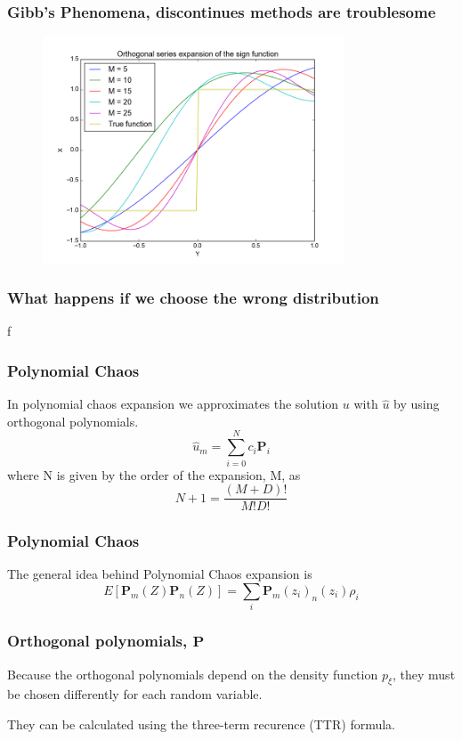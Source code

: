 \documentclass[handout]{beamer}
\newcommand{\p}{\boldsymbol{P}}
\begin{document}
\begin{frame}
  \frametitle{Gibb's Phenomena, discontinues methods are troublesome}
  \begin{figure}
  \includegraphics[width=0.8\textwidth]{gibbs.png}
  \end{figure}

  \end{frame}


\begin{frame}
  \frametitle{What happens if we choose the wrong distribution}
  
\end{frame}














 

\if f


\begin{frame}
  \frametitle{Polynomial Chaos}
  In polynomial chaos expansion we approximates the solution $u$ with $\hat u$ by using orthogonal polynomials.
  \[\hat u_m = \sum_{i=0}^N c_i \p_i\]
  where N is given by the order of the expansion, M, as
  \[N + 1 =\frac{(M + D)!}{M!D!}\]
\end{frame}


\begin{frame}
  \frametitle{Polynomial Chaos}
  The general idea behind Polynomial Chaos expansion is
  \[E[\p_m(Z)\p_n(Z)] = \sum_i \p_m(z_i)_n(z_i)\rho_i\]
\end{frame}



\begin{frame}
  \frametitle{Orthogonal polynomials, $\p$}
  Because the orthogonal polynomials depend on the density function $p_\xi$, they must be chosen differently for each random variable.\newline

  They can be calculated using the three-term recurence (TTR) formula.\newline

\end{frame}
\end{document}

